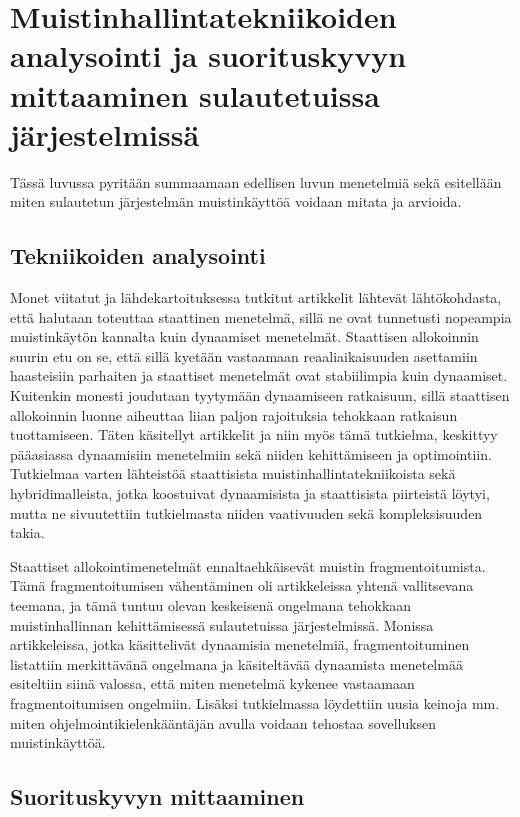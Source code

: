 \chapter{Muistinhallintatekniikoiden analysointi ja suorituskyvyn mittaaminen sulautetuissa järjestelmissä} \label{Kuudes luku}

Tässä luvussa pyritään summaamaan edellisen luvun menetelmiä sekä esitellään miten sulautetun järjestelmän muistinkäyttöä voidaan mitata ja arvioida.

\section{Tekniikoiden analysointi}

Monet viitatut ja lähdekartoituksessa tutkitut artikkelit lähtevät lähtökohdasta, että halutaan toteuttaa staattinen menetelmä, sillä ne ovat tunnetusti nopeampia muistinkäytön kannalta kuin dynaamiset menetelmät. Staattisen allokoinnin suurin etu on se, että sillä kyetään vastaamaan reaaliaikaisuuden asettamiin haasteisiin parhaiten ja staattiset menetelmät ovat stabiilimpia kuin dynaamiset\cite{daroemmfera@2006}. Kuitenkin monesti joudutaan tyytymään dynaamiseen ratkaisuun, sillä staattisen allokoinnin luonne aiheuttaa liian paljon rajoituksia tehokkaan ratkaisun tuottamiseen. Täten käsitellyt artikkelit ja niin myös tämä tutkielma, keskittyy pääasiassa dynaamisiin menetelmiin sekä niiden kehittämiseen ja optimointiin. Tutkielmaa varten lähteistöä staattisista muistinhallintatekniikoista sekä hybridimalleista, jotka koostuivat dynaamisista ja staattisista piirteistä löytyi, mutta ne sivuutettiin tutkielmasta niiden vaativuuden sekä kompleksisuuden takia.

Staattiset allokointimenetelmät ennaltaehkäisevät muistin fragmentoitumista\cite{daroemmfera@2006}. Tämä fragmentoitumisen vähentäminen oli artikkeleissa yhtenä vallitsevana teemana, ja tämä tuntuu olevan keskeisenä ongelmana tehokkaan muistinhallinnan kehittämisessä sulautetuissa järjestelmissä. Monissa artikkeleissa, jotka käsittelivät dynaamisia menetelmiä, fragmentoituminen listattiin merkittävänä ongelmana ja käsiteltävää dynaamista menetelmää esiteltiin siinä valossa, että miten menetelmä kykenee vastaamaan fragmentoitumisen ongelmiin. Lisäksi tutkielmassa löydettiin uusia keinoja mm. miten ohjelmointikielenkääntäjän avulla voidaan tehostaa sovelluksen muistinkäyttöä.

\section{Suorituskyvyn mittaaminen}

